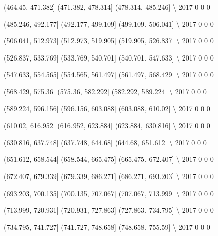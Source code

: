 \documentclass[11pt]{article}
\begin{document}
      (464.45, 471.382]  (471.382, 478.314]  (478.314, 485.246]  \textbackslash{}
2017                  0                   0                   0   

      (485.246, 492.177]  (492.177, 499.109]  (499.109, 506.041]  \textbackslash{}
2017                   0                   0                   0   

      (506.041, 512.973]  (512.973, 519.905]  (519.905, 526.837]  \textbackslash{}
2017                   0                   0                   0   

      (526.837, 533.769]  (533.769, 540.701]  (540.701, 547.633]  \textbackslash{}
2017                   0                   0                   0   

      (547.633, 554.565]  (554.565, 561.497]  (561.497, 568.429]  \textbackslash{}
2017                   0                   0                   0   

      (568.429, 575.36]  (575.36, 582.292]  (582.292, 589.224]  \textbackslash{}
2017                  0                  0                   0   

      (589.224, 596.156]  (596.156, 603.088]  (603.088, 610.02]  \textbackslash{}
2017                   0                   0                  0   

      (610.02, 616.952]  (616.952, 623.884]  (623.884, 630.816]  \textbackslash{}
2017                  0                   0                   0   

      (630.816, 637.748]  (637.748, 644.68]  (644.68, 651.612]  \textbackslash{}
2017                   0                  0                  0   

      (651.612, 658.544]  (658.544, 665.475]  (665.475, 672.407]  \textbackslash{}
2017                   0                   0                   0   

      (672.407, 679.339]  (679.339, 686.271]  (686.271, 693.203]  \textbackslash{}
2017                   0                   0                   0   

      (693.203, 700.135]  (700.135, 707.067]  (707.067, 713.999]  \textbackslash{}
2017                   0                   0                   0   

      (713.999, 720.931]  (720.931, 727.863]  (727.863, 734.795]  \textbackslash{}
2017                   0                   0                   0   

      (734.795, 741.727]  (741.727, 748.658]  (748.658, 755.59]  \textbackslash{}
2017                   0                   0                  0   
\end{document}
